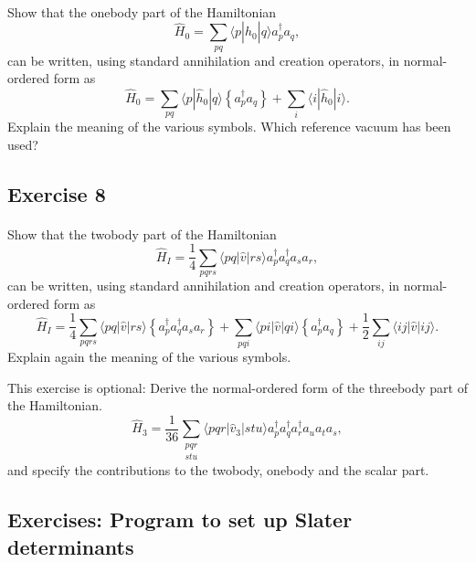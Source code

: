 \documentclass[%
twoside,                 %
final,                   %
10pt]{article}
\begin{document}
\paragraph{}
Show that the onebody part of the Hamiltonian
\[	     
\hat{H}_0 = \sum_{pq} \langle p|\hat{h}_0|q\rangle a^{\dagger}_p a_q,
\]
can be written, using standard annihilation and creation operators, in normal-ordered form as 
\[
\hat{H}_0 = \sum_{pq} \langle p|\hat{h}_0|q\rangle \left\{a^\dagger_p a_q\right\} +
             \sum_i \langle i|\hat{h}_0|i\rangle.
\]
Explain the meaning of the various symbols. Which reference 
vacuum has been used?

  

\subsection*{Exercise 8}

\paragraph{}
Show that the twobody part of the Hamiltonian
\[
  \hat{H}_I = \frac{1}{4} \sum_{pqrs} \langle pq|\hat{v}|rs\rangle a^\dagger_p a^\dagger_q a_s  a_r,
\]
can be written, using standard annihilation and creation operators, in normal-ordered form as 
\[
\hat{H}_I =\frac{1}{4} \sum_{pqrs} \langle pq|\hat{v}|rs\rangle \left\{a^\dagger_p a^\dagger_q a_s  a_r\right\}
            + \sum_{pqi} \langle pi|\hat{v}|qi\rangle \left\{a^\dagger_p a_q\right\} 
            + \frac{1}{2} \sum_{ij}\langle ij|\hat{v}|ij\rangle.
\]
Explain again the meaning of the various symbols.

This exercise is optional: Derive the normal-ordered form of the threebody part of the Hamiltonian.
\[
\hat{H}_3 = \frac{1}{36} \sum_{\substack{pqr \\ stu}}
                 \langle pqr|\hat{v}_3|stu\rangle a^\dagger_p a^\dagger_q a^\dagger_r a_u a_t a_s,
\]
and specify the contributions to the twobody, onebody and the scalar part.




\subsection*{Exercises: Program to set up Slater determinants}

\end{document}

